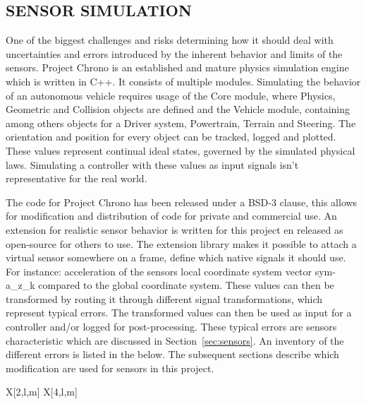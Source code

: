 \subsection{SENSOR SIMULATION}\label{sec:sensor simulation}

One of the biggest challenges and risks determining how it should deal with uncertainties and errors introduced by the
inherent behavior and limits of the sensors. Project Chrono is an established and mature physics simulation engine which
is written in C++. It consists of multiple modules. Simulating the behavior of an autonomous vehicle requires usage of
the Core module, where Physics, Geometric and Collision objects are defined and the Vehicle module, containing among
others objects for a Driver system, Powertrain, Terrain and Steering. The orientation and position for every object can
be tracked, logged and plotted. These values represent continual ideal states, governed by the simulated physical laws.
Simulating a controller with these values as input signals isn't representative for the real world.

The code for Project Chrono has been released under a BSD-3 clause, this allows for modification and distribution of
code for private and commercial use. An extension for realistic sensor behavior is written for this project en released
as open-source for others to use. The extension library makes it possible to attach a virtual sensor somewhere on a
frame, define which native signals it should use. For instance: acceleration of the sensors local coordinate system
vector \gls{sym-a_z_k} compared to the global coordinate system. These values can then be transformed by routing it
through different signal transformations, which represent typical errors. The transformed values can then be used as
input for a controller and/or logged for post-processing. These typical errors are sensors characteristic which are
discussed in Section~\ref{sec:sensors}. An inventory of the different errors is listed in the below. The subsequent
sections describe which modification are used for sensors in this project.

\begin{RoyalTable}{X[2,l,m] X[4,l,m]}
\end{RoyalTable}

